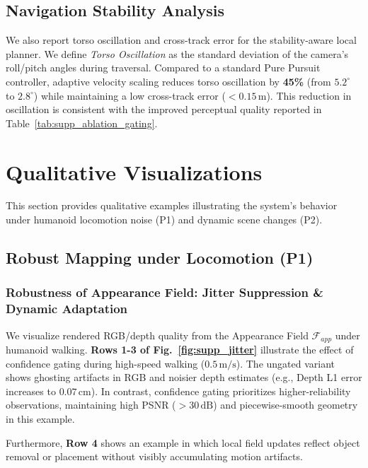 \documentclass[conference]{IEEEtran}
\begin{document}
\subsection{Navigation Stability Analysis}
We also report torso oscillation and cross-track error for the stability-aware local planner. We define \textit{Torso Oscillation} as the standard deviation of the camera's roll/pitch angles during traversal. 
Compared to a standard Pure Pursuit controller, adaptive velocity scaling reduces torso oscillation by \textbf{45\%} (from $5.2^\circ$ to $2.8^\circ$) while maintaining a low cross-track error ($<0.15\,\text{m}$). This reduction in oscillation is consistent with the improved perceptual quality reported in Table~\ref{tab:supp_ablation_gating}.

\section{Qualitative Visualizations}
\label{sec:qualitative_results}

This section provides qualitative examples illustrating the system's behavior under humanoid locomotion noise (P1) and dynamic scene changes (P2).

\subsection{Robust Mapping under Locomotion (P1)}

\subsubsection{Robustness of Appearance Field: Jitter Suppression \& Dynamic Adaptation}

We visualize rendered RGB/depth quality from the Appearance Field $\mathcal{F}_{app}$ under humanoid walking. \textbf{Rows 1-3 of Fig.~\ref{fig:supp_jitter}} illustrate the effect of confidence gating during high-speed walking ($0.5\,\text{m/s}$). The ungated variant shows ghosting artifacts in RGB and noisier depth estimates (e.g., Depth L1 error increases to $0.07\,\text{cm}$). In contrast, confidence gating prioritizes higher-reliability observations, maintaining high PSNR ($>30\,\text{dB}$) and piecewise-smooth geometry in this example.

Furthermore, \textbf{Row 4} shows an example in which local field updates reflect object removal or placement without visibly accumulating motion artifacts.
\end{document}
